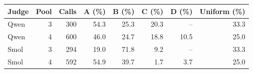 

\footnotesize
\begin{tabular*}{\textwidth}{@{\extracolsep{\fill}}lrrrrrrr}
\toprule
Judge & Pool & Calls & A (\%) & B (\%) & C (\%) & D (\%) & Uniform (\%)\\
\midrule
Qwen & 3 & 300 & 54.3 & 25.3 & 20.3 & -- & 33.3\\
Qwen & 4 & 600 & 46.0 & 24.7 & 18.8 & 10.5 & 25.0\\
Smol & 3 & 294 & 19.0 & 71.8 & 9.2 & -- & 33.3\\
Smol & 4 & 592 & 54.9 & 39.7 & 1.7 & 3.7 & 25.0\\
\bottomrule
\end{tabular*}
